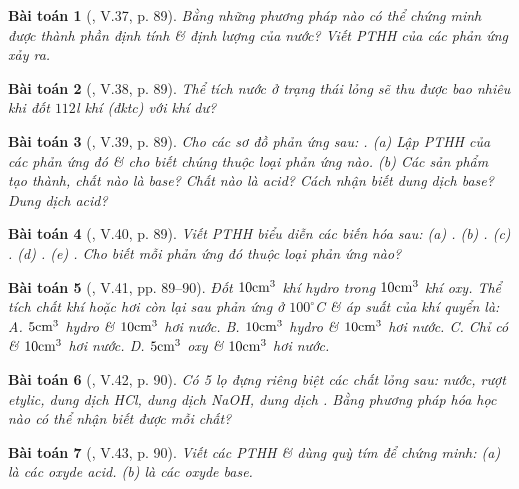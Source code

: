 \documentclass{article}
\newtheorem{baitoan}{Bài toán}
\begin{document}
\begin{baitoan}[\cite{Truong_BTNC_Hoa_Hoc_8_2022}, V.37, p. 89]
	Bằng những phương pháp nào có thể chứng minh được thành phần định tính \& định lượng của nước? Viết PTHH của các phản ứng xảy ra.
\end{baitoan}

\begin{baitoan}[\cite{Truong_BTNC_Hoa_Hoc_8_2022}, V.38, p. 89]
	Thể tích nước ở trạng thái lỏng sẽ thu được bao nhiêu khi đốt $112$\emph{l} khí \emph{} (đktc) với khí \emph{} dư?
\end{baitoan}

\begin{baitoan}[\cite{Truong_BTNC_Hoa_Hoc_8_2022}, V.39, p. 89]
	Cho các sơ đồ phản ứng sau: \emph{}. (a) Lập PTHH của các phản ứng đó \& cho biết chúng thuộc loại phản ứng nào. (b) Các sản phẩm tạo thành, chất nào là base? Chất nào là acid? Cách nhận biết dung dịch base? Dung dịch acid?
\end{baitoan}

\begin{baitoan}[\cite{Truong_BTNC_Hoa_Hoc_8_2022}, V.40, p. 89]
	Viết PTHH biểu diễn các biến hóa sau: (a) \emph{}. (b) \emph{}. (c) \emph{}. (d) \emph{}. (e) \emph{}. Cho biết mỗi phản ứng đó thuộc loại phản ứng nào?
\end{baitoan}

\begin{baitoan}[\cite{Truong_BTNC_Hoa_Hoc_8_2022}, V.41, pp. 89--90]
	Đốt $\rm10cm^3$ khí hydro trong $\rm10cm^3$ khí oxy. Thể tích chất khí hoặc hơi còn lại sau phản ứng ở $100^\circ$C \& áp suất của khí quyển là: {\sf A.} $\rm5cm^3$ hydro \& $\rm10cm^3$ hơi nước. {\sf B.} $\rm10cm^3$ hydro \& $\rm10cm^3$ hơi nước. {\sf C.} Chỉ có \& $\rm10cm^3$ hơi nước. {\sf D.} $\rm5cm^3$ oxy \& $\rm10cm^3$ hơi nước. 
\end{baitoan}

\begin{baitoan}[\cite{Truong_BTNC_Hoa_Hoc_8_2022}, V.42, p. 90]
	Có 5 lọ đựng riêng biệt các chất lỏng sau: nước, rượt etylic, dung dịch \emph{HCl}, dung dịch \emph{NaOH}, dung dịch \emph{}. Bằng phương pháp hóa học nào có thể nhận biết được mỗi chất?
\end{baitoan}

\begin{baitoan}[\cite{Truong_BTNC_Hoa_Hoc_8_2022}, V.43, p. 90]
	Viết các PTHH \& dùng quỳ tím để chứng minh: (a) \emph{} là các oxyde acid. (b) \emph{} là các oxyde base.
\end{baitoan}
\end{document}
